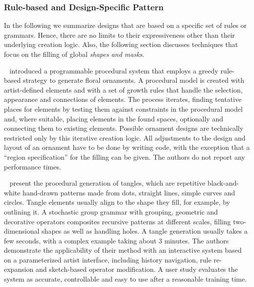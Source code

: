  

\subsubsection{Rule-based and Design-Specific Pattern}
\label{subsubsec:analysis_rulebased_and_designspecific}

In the following we summarize designs that are based on a specific set of rules or grammars. Hence, there are no limits to their expressiveness other than their underlying creation logic. Also, the following section discusses techniques that focus on the filling of global \textit{shapes and masks}.



\citeauthor*{wong_1998_cgf}~\cite{wong_1998_cgf} introduced a programmable procedural system that employs a greedy rule-based strategy to generate floral ornaments. A procedural model is created with artist-defined elements and with a set of growth rules that handle the selection, appearance and connections of elements. The process iterates, finding tentative places for elements by testing them against constraints in the procedural model and, where suitable, placing elements in the found spaces, optionally and connecting them to existing elements. Possible ornament designs are technically restricted only by this iterative creation logic. All adjustments to the design and layout of an ornament have to be done by writing code, with the exception that a ``region specification'' for the filling can be given. The authors do not report any performance times.

\citeauthor*{santoni_2016_ggp}~\cite{santoni_2016_ggp} present the procedural generation of tangles, which are repetitive black-and-white hand-drawn patterns made from dots, straight lines, simple curves and circles. Tangle elements usually align to the shape they fill, for example, by outlining it. A stochastic group grammar with grouping, geometric and decorative operators composites recursive patterns at different scales, filling two-dimensional shapes as well as handling holes. A tangle generation usually takes a few seconds, with a complex example taking about 3 minutes. The authors demonstrate the applicability of their method with an interactive system based on a parameterized artist interface, including history navigation, rule re-expansion and sketch-based operator modification. A user study evaluates the system as accurate, controllable and easy to use after a reasonable training time.

